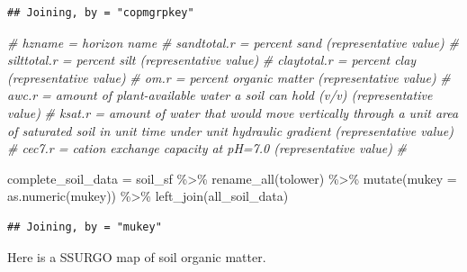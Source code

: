 \documentclass[
]{book}
\newenvironment{Shaded}{\begin{snugshade}}{\end{snugshade}}
\newcommand{\AttributeTok}[1]{\textcolor[rgb]{0.77,0.63,0.00}{#1}}
\newcommand{\CommentTok}[1]{\textcolor[rgb]{0.56,0.35,0.01}{\textit{#1}}}
\newcommand{\DecValTok}[1]{\textcolor[rgb]{0.00,0.00,0.81}{#1}}
\newcommand{\FloatTok}[1]{\textcolor[rgb]{0.00,0.00,0.81}{#1}}
\newcommand{\FunctionTok}[1]{\textcolor[rgb]{0.00,0.00,0.00}{#1}}
\newcommand{\NormalTok}[1]{#1}
\newcommand{\OtherTok}[1]{\textcolor[rgb]{0.56,0.35,0.01}{#1}}
\newcommand{\SpecialCharTok}[1]{\textcolor[rgb]{0.00,0.00,0.00}{#1}}
\newcommand{\StringTok}[1]{\textcolor[rgb]{0.31,0.60,0.02}{#1}}
\begin{document}
\begin{verbatim}
## Joining, by = "copmgrpkey"
\end{verbatim}

\begin{Shaded}
\begin{Highlighting}[]
\CommentTok{\# hzname = horizon name}
\CommentTok{\# sandtotal.r = percent sand (representative value)}
\CommentTok{\# silttotal.r = percent silt (representative value)}
\CommentTok{\# claytotal.r = percent clay (representative value)}
\CommentTok{\# om.r = percent organic matter (representative value)}
\CommentTok{\# awc.r = amount of plant{-}available water a soil can hold (v/v) (representative value)}
\CommentTok{\# ksat.r = amount of water that would move vertically through a unit area of saturated soil in unit time under unit hydraulic gradient (representative value)}
\CommentTok{\# cec7.r = cation exchange capacity at pH=7.0 (representative value)}
\CommentTok{\# }

\NormalTok{complete\_soil\_data }\OtherTok{=}\NormalTok{ soil\_sf }\SpecialCharTok{\%\textgreater{}\%}
  \FunctionTok{rename\_all}\NormalTok{(tolower) }\SpecialCharTok{\%\textgreater{}\%}
  \FunctionTok{mutate}\NormalTok{(}\AttributeTok{mukey =} \FunctionTok{as.numeric}\NormalTok{(mukey)) }\SpecialCharTok{\%\textgreater{}\%}
  \FunctionTok{left\_join}\NormalTok{(all\_soil\_data)}
\end{Highlighting}
\end{Shaded}

\begin{verbatim}
## Joining, by = "mukey"
\end{verbatim}

Here is a SSURGO map of soil organic matter.

\begin{Shaded}
\end{Shaded}
\end{document}
